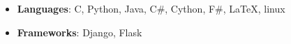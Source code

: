 \begin{itemize}[leftmargin=0.15in, label={}, itemsep=0em]
  \item \textbf{Languages}{: C, Python, Java, C\#, Cython, F\#, \LaTeX, linux}
  \item \textbf{Frameworks}{: Django, Flask}
\end{itemize}
